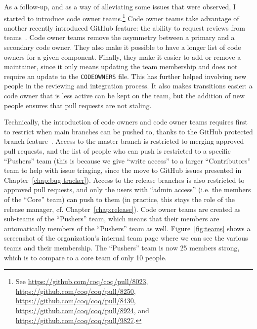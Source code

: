 As a follow-up, and as a way of alleviating some issues that were observed, I started to introduce code owner teams.\footnote{
	See \url{https://github.com/coq/coq/pull/8023}, \url{https://github.com/coq/coq/pull/8250}, \url{https://github.com/coq/coq/pull/8430}, \url{https://github.com/coq/coq/pull/8924}, and \url{https://github.com/coq/coq/pull/9827}.
}
Code owner teams take advantage of another recently introduced GitHub feature: the ability to request reviews from teams~\cite{github_team_reviews}.
Code owner teams remove the asymmetry between a primary and a secondary code owner.
They also make it possible to have a longer list of code owners for a given component.
Finally, they make it easier to add or remove a maintainer, since it only means updating the team membership and does not require an update to the \verb|CODEOWNERS| file.
This has further helped involving new people in the reviewing and integration process.
It also makes transitions easier: a code owner that is less active can be kept on the team, but the addition of new people ensures that pull requests are not staling.


Technically, the introduction of code owners and code owner teams requires first to restrict when main branches can be pushed to, thanks to the GitHub protected branch feature~\cite{github_protected_branches,github_protected_branch_restrict_pusher,github_protected_branch_regex}.
Access to the master branch is restricted to merging approved pull requests, and the list of people who can push is restricted to a specific ``Pushers'' team (this is because we give ``write access'' to a larger ``Contributors'' team to help with issue triaging, since the move to GitHub issues presented in Chapter~\ref{chap:bug-tracker}).
Access to the release branches is also restricted to approved pull requests, and only the users with ``admin access'' (i.e. the members of the ``Core'' team) can push to them (in practice, this stays the role of the release manager, cf. Chapter~\ref{chap:release}).
Code owner teams are created as sub-teams of the ``Pushers'' team, which means that their members are automatically members of the ``Pushers'' team as well.
Figure~\ref{fig:teams} shows a screenshot of the organization's internal team page where we can see the various teams and their membership. The ``Pushers'' team is now 25 members strong, which is to compare to a core team of only 10 people.

